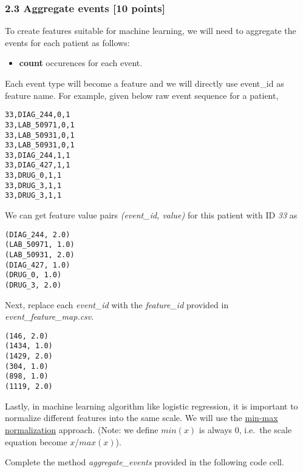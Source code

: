 \documentclass[11pt]{article}
\providecommand{\tightlist}{%
      \setlength{\itemsep}{0pt}\setlength{\parskip}{0pt}}
\begin{document}
    \hypertarget{aggregate-events-10-points}{%
\subsubsection{2.3 Aggregate events {[}10
points{]}}\label{aggregate-events-10-points}}

To create features suitable for machine learning, we will need to
aggregate the events for each patient as follows:

\begin{itemize}
\tightlist
\item
  \textbf{count} occurences for each event.
\end{itemize}

Each event type will become a feature and we will directly use event\_id
as feature name. For example, given below raw event sequence for a
patient,

\begin{verbatim}
33,DIAG_244,0,1
33,LAB_50971,0,1
33,LAB_50931,0,1
33,LAB_50931,0,1
33,DIAG_244,1,1
33,DIAG_427,1,1
33,DRUG_0,1,1
33,DRUG_3,1,1
33,DRUG_3,1,1
\end{verbatim}

We can get feature value pairs \emph{(event\_id, value)} for this
patient with ID \emph{33} as

\begin{verbatim}
(DIAG_244, 2.0)
(LAB_50971, 1.0)
(LAB_50931, 2.0)
(DIAG_427, 1.0)
(DRUG_0, 1.0)
(DRUG_3, 2.0)
\end{verbatim}

Next, replace each \emph{event\_id} with the \emph{feature\_id} provided
in \emph{event\_feature\_map.csv}.

\begin{verbatim}
(146, 2.0)
(1434, 1.0)
(1429, 2.0)
(304, 1.0)
(898, 1.0)
(1119, 2.0)
\end{verbatim}

Lastly, in machine learning algorithm like logistic regression, it is
important to normalize different features into the same scale. We will
use the
\href{http://stats.stackexchange.com/questions/70801/how-to-normalize-data-to-0-1-range}{min-max
normalization} approach. (Note: we define \(min(x)\) is always 0,
i.e.~the scale equation become \(x\)/\(max(x)\)).

Complete the method \emph{aggregate\_events} provided in the following
code cell.
\end{document}
